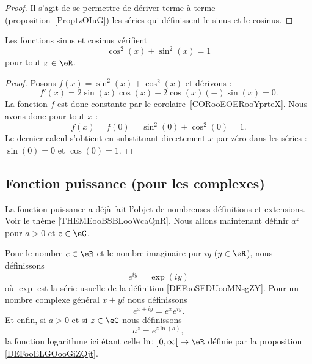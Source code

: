 \begin{proof}
    Il s'agit de se permettre de dériver terme à terme (proposition~\ref{ProptzOIuG}) les séries qui définissent le sinus et le cosinus.
\end{proof}

\begin{lemma}       \label{LEMooAEFPooGSgOkF}
    Les fonctions sinus et cosinus vérifient
    \begin{equation}        \label{EQooNYCZooApyyRd}
        \cos^2(x)+\sin^2(x)=1
    \end{equation}
    pour tout \( x\in \eR\).
\end{lemma}

\begin{proof}
    Posons \( f(x)=\sin^2(x)+\cos^2(x)\) et dérivons :
    \begin{equation}
        f'(x)=2\sin(x)\cos(x)+2\cos(x)(-)\sin(x)=0.
    \end{equation}
    La fonction \( f\) est donc constante par le corolaire~\ref{CORooEOERooYprteX}. Nous avons donc pour tout \( x\) :
    \begin{equation}
        f(x)=f(0)=\sin^2(0)+\cos^2(0)=1.
    \end{equation}
    Le dernier calcul s'obtient en substituant directement \( x\) par zéro dans les séries : \( \sin(0)=0\) et \( \cos(0)=1\).
\end{proof}

\subsection{Fonction puissance (pour les complexes)}

La fonction puissance a déjà fait l'objet de nombreuses définitions et extensions. Voir le thème \ref{THEMEooBSBLooWcaQnR}. Nous allons maintenant définir \( a^z\) pour \( a>0\) et \( z\in \eC\). 

\begin{definition}      \label{DEFooRBTDooNLcWGj}
    Pour le nombre \( e\in \eR\) et le nombre imaginaire pur \( iy\) (\( y\in \eR\)), nous définissons
    \begin{equation}
        e^{iy}=\exp(iy)
    \end{equation}
    où \( \exp\) est la série usuelle de la définition \ref{DEFooSFDUooMNsgZY}. Pour un nombre complexe général \( x+yi\) nous définissons
    \begin{equation}
        e^{x+iy}= e^{x} e^{iy}.
    \end{equation}
    Et enfin, si \( a>0\) et si \( z\in \eC\) nous définissons
    \begin{equation}
        a^z= e^{z\ln(a)},
    \end{equation}
    la fonction logarithme ici étant celle \( \ln\colon \mathopen] 0 , \infty \mathclose[\to \eR\) définie par la proposition \ref{DEFooELGOooGiZQjt}.
\end{definition}

